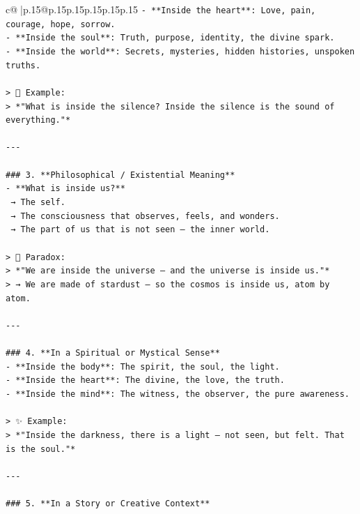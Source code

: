 \documentclass{article}
\begin{document}
{\begin{supertabular}{c@{$\;$}|p{.15\linewidth}@{}p{.15\linewidth}p{.15\linewidth}p{.15\linewidth}p{.15\linewidth}p{.15\linewidth}}
{{{\texttt{{-} **Inside the heart**: Love, pain, courage, hope, sorrow.  } \\
\texttt{{-} **Inside the soul**: Truth, purpose, identity, the divine spark.  } \\
\texttt{{-} **Inside the world**: Secrets, mysteries, hidden histories, unspoken truths.} \\
\\ 
\texttt{> 🌌 Example:  } \\
\texttt{> *"What is inside the silence? Inside the silence is the sound of everything."*} \\
\\ 
\texttt{{-}{-}{-}} \\
\\ 
\texttt{\#\#\# 3. **Philosophical / Existential Meaning**  } \\
\texttt{{-} **What is inside us?**  } \\
\texttt{  → The self.  } \\
\texttt{  → The consciousness that observes, feels, and wonders.  } \\
\texttt{  → The part of us that is not seen — the inner world.} \\
\\ 
\texttt{> 🤯 Paradox:  } \\
\texttt{> *"We are inside the universe — and the universe is inside us."*  } \\
\texttt{> → We are made of stardust — so the cosmos is inside us, atom by atom.} \\
\\ 
\texttt{{-}{-}{-}} \\
\\ 
\texttt{\#\#\# 4. **In a Spiritual or Mystical Sense**  } \\
\texttt{{-} **Inside the body**: The spirit, the soul, the light.  } \\
\texttt{{-} **Inside the heart**: The divine, the love, the truth.  } \\
\texttt{{-} **Inside the mind**: The witness, the observer, the pure awareness.} \\
\\ 
\texttt{> ✨ Example:  } \\
\texttt{> *"Inside the darkness, there is a light — not seen, but felt. That is the soul."*} \\
\\ 
\texttt{{-}{-}{-}} \\
\\ 
\texttt{\#\#\# 5. **In a Story or Creative Context**  } \\
}}}
\end{supertabular}}
\end{document}
